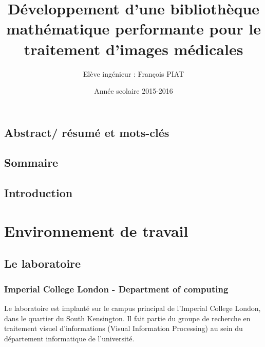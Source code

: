 \documentclass[10pt]{report}
\title{Développement d'une bibliothèque mathématique performante pour le traitement d'images médicales}
\author{Elève ingénieur : François PIAT}
\date{Année scolaire 2015-2016}
\begin{document}
\maketitle

\section*{Abstract/ résumé et mots-clés} %
\section*{Sommaire}
\tableofcontents

\section*{Introduction}

\chapter{Environnement de travail} 
	\section{Le laboratoire}
	\subsection{Imperial College London - Department of computing}
	Le laboratoire est implanté sur le campus principal de l'Imperial College London, dans le quartier du South Kensington. Il fait partie du groupe de recherche en traitement visuel d'informations (Visual Information Processing) au sein du département informatique de l'université.
	
	
\end{document}
